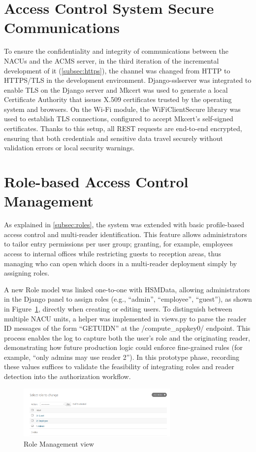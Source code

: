\section{Access Control System Secure Communications}
To ensure the confidentiality and integrity of communications between the NACUs and the ACMS server, in the third iteration of the incremental development of it (\ref{subsec:https}), the channel was changed from HTTP to HTTPS/TLS in the development environment. Django-sslserver was integrated to enable TLS on the Django server and Mkcert was used to generate a local Certificate Authority that issues X.509 certificates trusted by the operating system and browsers. On the Wi-Fi module, the WiFiClientSecure library was used to establish TLS connections, configured to accept Mkcert's self-signed certificates. Thanks to this setup, all REST requests are end-to-end encrypted, ensuring that both credentials and sensitive data travel securely without validation errors or local security warnings.

\section{Role-based Access Control Management}
As explained in \ref{subsec:roles}, the system was extended with basic profile-based access control and multi-reader identification. This feature allows administrators to tailor entry permissions per user group; granting, for example, employees access to internal offices while restricting guests to reception areas, thus managing who can open which doors in a multi-reader deployment simply by assigning roles.

A new Role model was linked one-to-one with HSMData, allowing administrators in the Django panel to assign roles (e.g., “admin”, “employee”, “guest”), as shown in Figure~\ref{fig:role_management}, directly when creating or editing users. To distinguish between multiple NACU units, a helper was implemented in views.py to parse the reader ID messages of the form “GETUIDN” at the /compute\_appkey0/ endpoint. This process enables the log to capture both the user’s role and the originating reader, demonstrating how future production logic could enforce fine-grained rules (for example, “only admins may use reader 2”). In this prototype phase, recording these values suffices to validate the feasibility of integrating roles and reader detection into the authorization workflow.

\begin{figure}[h]
	\centering
	\includegraphics[width=0.7\textwidth]{imaxes/Roles} %
	\caption{Role Management view}
	\label{fig:role_management}
\end{figure}

